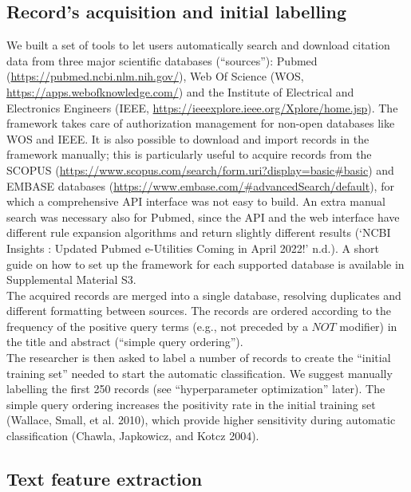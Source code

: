 \documentclass{article}
\begin{document}
\hypertarget{records-acquisition-and-initial-labelling}{%
\subsection{Record's acquisition and initial
labelling}\label{records-acquisition-and-initial-labelling}}

We built a set of tools to let users automatically search and download
citation data from three major scientific databases (``sources''):
Pubmed (\url{https://pubmed.ncbi.nlm.nih.gov/}), Web Of Science (WOS,
\url{https://apps.webofknowledge.com/}) and the Institute of Electrical
and Electronics Engineers (IEEE,
\url{https://ieeexplore.ieee.org/Xplore/home.jsp}). The framework takes
care of authorization management for non-open databases like WOS and
IEEE. It is also possible to download and import records in the
framework manually; this is particularly useful to acquire records from
the SCOPUS
(\url{https://www.scopus.com/search/form.uri?display=basic\#basic}) and
EMBASE databases
(\url{https://www.embase.com/\#advancedSearch/default}), for which a
comprehensive API interface was not easy to build. An extra manual
search was necessary also for Pubmed, since the API and the web
interface have different rule expansion algorithms and return slightly
different results ({`NCBI Insights : Updated Pubmed e-Utilities Coming
in April 2022!'} n.d.). A short guide on how to set up the framework for
each supported database is available in Supplemental Material S3.\\
The acquired records are merged into a single database, resolving
duplicates and different formatting between sources. The records are
ordered according to the frequency of the positive query terms (e.g.,
not preceded by a \(NOT\) modifier) in the title and abstract (``simple
query ordering'').\\
The researcher is then asked to label a number of records to create the
``initial training set'' needed to start the automatic classification.
We suggest manually labelling the first 250 records (see
``hyperparameter optimization'' later). The simple query ordering
increases the positivity rate in the initial training set (Wallace,
Small, et al. 2010), which provide higher sensitivity during automatic
classification (Chawla, Japkowicz, and Kotcz 2004).

\hypertarget{text-feature-extraction}{%
\subsection{Text feature extraction}\label{text-feature-extraction}}
\end{document}

